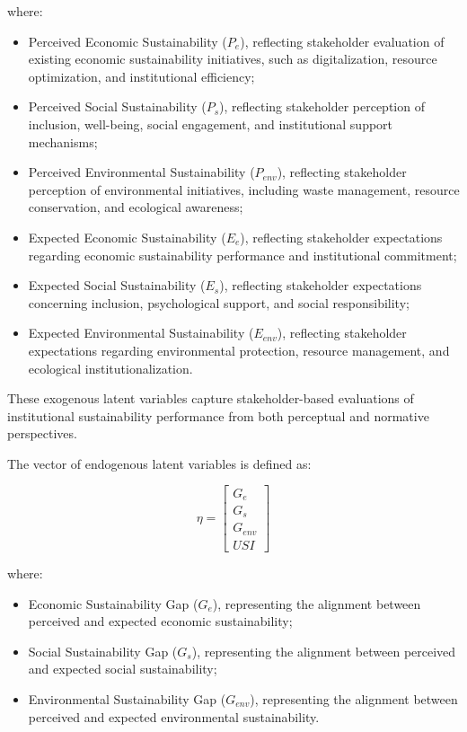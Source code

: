\documentclass[11pt,a4paper]{article}
\begin{document}
where:

\begin{itemize}
\item Perceived Economic Sustainability ($P_e$), reflecting stakeholder evaluation of existing economic sustainability initiatives, such as digitalization, resource optimization, and institutional efficiency;
\item Perceived Social Sustainability ($P_s$), reflecting stakeholder perception of inclusion, well-being, social engagement, and institutional support mechanisms;
\item Perceived Environmental Sustainability ($P_{env}$), reflecting stakeholder perception of environmental initiatives, including waste management, resource conservation, and ecological awareness;
\item Expected Economic Sustainability ($E_e$), reflecting stakeholder expectations regarding economic sustainability performance and institutional commitment;
\item Expected Social Sustainability ($E_s$), reflecting stakeholder expectations concerning inclusion, psychological support, and social responsibility;
\item Expected Environmental Sustainability ($E_{env}$), reflecting stakeholder expectations regarding environmental protection, resource management, and ecological institutionalization.
\end{itemize}

These exogenous latent variables capture stakeholder-based evaluations of institutional sustainability performance from both perceptual and normative perspectives.

The vector of endogenous latent variables is defined as:

\begin{equation}
\eta =
\begin{bmatrix}
G_e \\
G_s \\
G_{env} \\
USI
\end{bmatrix}
\end{equation}

where:

\begin{itemize}
\item Economic Sustainability Gap ($G_e$), representing the alignment between perceived and expected economic sustainability;
\item Social Sustainability Gap ($G_s$), representing the alignment between perceived and expected social sustainability;
\item Environmental Sustainability Gap ($G_{env}$), representing the alignment between perceived and expected environmental sustainability.
\end{itemize}
\end{document}
